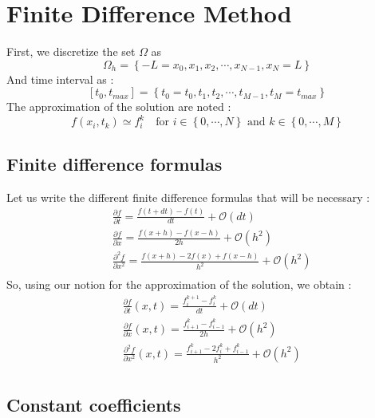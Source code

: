 \documentclass[11pt,a4paper]{article}
\begin{document}
\section{Finite Difference Method}
First, we discretize the set $\Omega$ as \[\Omega_h = \left\lbrace -L = x_0, x_1, x_2, \cdots, x_{N-1}, x_N = L \right\rbrace \]
And time interval as : 
\[[t_0, t_{max}] = \left\lbrace t_0 = t_0, t_1, t_2, \cdots, t_{M-1}, t_M = t_{max} \right\rbrace \]
The approximation of the solution are noted :
 \[f(x_i, t_k) \simeq f_i^k \: \: \:   \text{    for } i \in \left\lbrace 0, \cdots, N\right\rbrace  \text{ and } k \in \left\lbrace 0, \cdots, M \right\rbrace  \]
\subsection{Finite difference formulas}
Let us write the different finite difference formulas that will be necessary  : 
\begin{align*}
&\frac{\partial f}{\partial t} = \frac{f(t + dt) - f(t)}{dt} + \mathcal{O}(dt) \\
&\frac{\partial f}{\partial x} = \frac{f(x + h) - f(x - h)}{2h} + \mathcal{O}(h^2) \\
&\frac{\partial^2 f}{\partial x^2} =  \frac{f(x+h) - 2 f(x) + f(x-h)}{h^{2}} + \mathcal{O}(h^2) \\
\end{align*}
So, using our notion for the approximation of the solution, we obtain : 
\begin{align*}
&\frac{\partial f}{\partial t}(x, t) = \frac{f_i^{k+1} - f_i^{k}}{dt} + \mathcal{O}(dt) \\
&\frac{\partial f}{\partial x}(x, t) = \frac{f_{i+1}^{k} - f_{i-1}^{k}}{2h} + \mathcal{O}(h^2) \\
&\frac{\partial^2 f}{\partial x^2}(x, t) =  \frac{f_{i+1}^{k} - 2 f_{i}^{k} + f_{i-1}^{k}}{h^{2}} + \mathcal{O}(h^2) \\
\end{align*}

\subsection{Constant coefficients}
\end{document}
